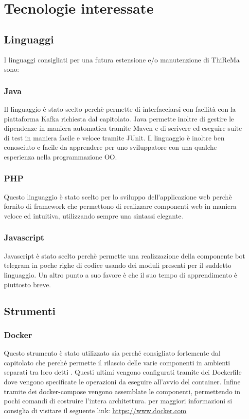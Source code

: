 \section{Tecnologie interessate}
	\subsection{Linguaggi}
		I linguaggi consigliati per una futura estensione e/o manutenzione di ThiReMa sono:
		\subsubsection{Java}
			Il linguaggio è stato scelto perchè permette di interfacciarsi con facilità con la piattaforma Kafka richiesta dal capitolato. Java permette inoltre di gestire le dipendenze in maniera automatica tramite Maven e di scrivere ed eseguire suite di test in maniera facile e veloce tramite JUnit. Il linguaggio è inoltre ben conosciuto e facile da apprendere per uno sviluppatore con una qualche esperienza nella programmazione OO. 
		\subsubsection{PHP}
			Questo linguaggio è stato scelto per lo sviluppo dell'applicazione web perchè fornito di framework che permettono di realizzare componenti web in maniera veloce ed intuitiva, utilizzando sempre una sintassi elegante.
		\subsubsection{Javascript}
			Javascript è stato scelto perchè permette una realizzazione della componente bot telegram in poche righe di codice usando dei moduli presenti per il suddetto linguaggio. Un altro punto a suo favore è che il suo tempo di apprendimento è piuttosto breve.
	\subsection{Strumenti}
		\subsubsection{Docker}
			Questo strumento è stato utilizzato sia perché consigliato fortemente dal capitolato che perché permette il rilascio delle varie componenti in ambienti separati tra loro detti . Questi ultimi vengono configurati tramite dei Dockerfile dove vengono specificate le operazioni da eseguire all'avvio del container. Infine tramite dei docker-compose vengono assemblate le componenti, permettendo in pochi comandi di costruire l'intera architettura. per maggiori informazioni si consiglia di visitare il seguente link: \url{https://www.docker.com}
